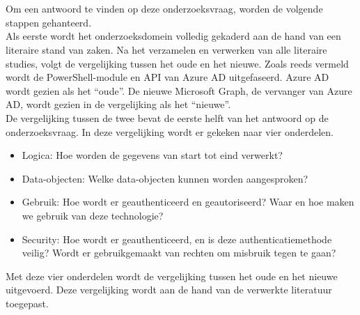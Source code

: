 
\chapter{}%
\label{ch:methodologie}


Om een antwoord te vinden op deze onderzoeksvraag, worden de volgende stappen gehanteerd. \\

Als eerste wordt het onderzoeksdomein volledig gekaderd aan de hand van een literaire stand van zaken. Na het verzamelen en verwerken van alle literaire studies, volgt de vergelijking tussen het oude en het nieuwe. Zoals reeds vermeld wordt de PowerShell-module en \ac{API} van Azure \ac{AD} uitgefaseerd. Azure \ac{AD} wordt gezien als het “oude”. De nieuwe Microsoft Graph, de vervanger van Azure \ac{AD}, wordt gezien in de vergelijking als het “nieuwe”. \\

De vergelijking tussen de twee bevat de eerste helft van het antwoord op de onderzoeksvraag. In deze vergelijking wordt er gekeken naar vier onderdelen.

\begin{itemize}
    \item Logica: Hoe worden de gegevens van start tot eind verwerkt?
    \item Data-objecten: Welke data-objecten kunnen worden aangesproken?
    \item Gebruik: Hoe wordt er geauthenticeerd en geautoriseerd? Waar en hoe maken we gebruik van deze technologie?
    \item Security: Hoe wordt er geauthenticeerd, en is deze authenticatiemethode veilig? Wordt er gebruikgemaakt van rechten om misbruik tegen te gaan?
\end{itemize}

Met deze vier onderdelen wordt de vergelijking tussen het oude en het nieuwe uitgevoerd. Deze vergelijking wordt aan de hand van de verwerkte literatuur toegepast. \\

